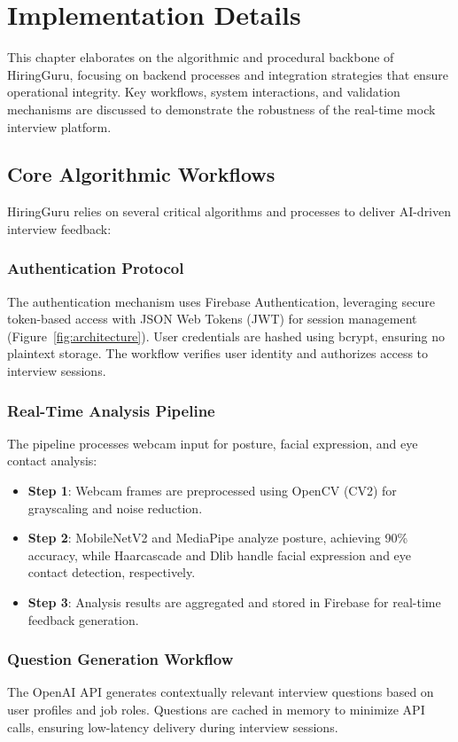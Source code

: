 \chapter{Implementation Details}
\label{ch:implementation}

This chapter elaborates on the algorithmic and procedural backbone of HiringGuru, focusing on backend processes and integration strategies that ensure operational integrity. Key workflows, system interactions, and validation mechanisms are discussed to demonstrate the robustness of the real-time mock interview platform.

\section{Core Algorithmic Workflows}
HiringGuru relies on several critical algorithms and processes to deliver AI-driven interview feedback:

\subsection{Authentication Protocol}
The authentication mechanism uses Firebase Authentication, leveraging secure token-based access with JSON Web Tokens (JWT) for session management (Figure~\ref{fig:architecture}). User credentials are hashed using bcrypt, ensuring no plaintext storage. The workflow verifies user identity and authorizes access to interview sessions.

\subsection{Real-Time Analysis Pipeline}
The pipeline processes webcam input for posture, facial expression, and eye contact analysis:
\begin{itemize}
    \item \textbf{Step 1}: Webcam frames are preprocessed using OpenCV (CV2) for grayscaling and noise reduction.
    \item \textbf{Step 2}: MobileNetV2 and MediaPipe analyze posture, achieving 90\% accuracy, while Haarcascade and Dlib handle facial expression and eye contact detection, respectively.
    \item \textbf{Step 3}: Analysis results are aggregated and stored in Firebase for real-time feedback generation.
\end{itemize}

\subsection{Question Generation Workflow}
The OpenAI API generates contextually relevant interview questions based on user profiles and job roles. Questions are cached in memory to minimize API calls, ensuring low-latency delivery during interview sessions.

